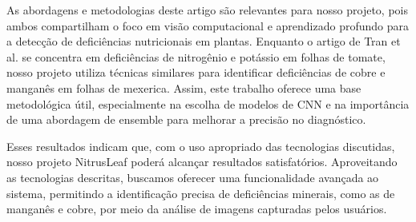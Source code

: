 As abordagens e metodologias deste artigo são relevantes para nosso projeto, pois ambos compartilham o foco em visão computacional e aprendizado profundo para a detecção de deficiências nutricionais em plantas. Enquanto o artigo de Tran et al. se concentra em deficiências de nitrogênio e potássio em folhas de tomate, nosso projeto utiliza técnicas similares para identificar deficiências de cobre e manganês em folhas de mexerica. Assim, este trabalho oferece uma base metodológica útil, especialmente na escolha de modelos de CNN e na importância de uma abordagem de ensemble para melhorar a precisão no diagnóstico.

Esses resultados indicam que, com o uso apropriado das tecnologias discutidas, nosso projeto NitrusLeaf poderá alcançar resultados satisfatórios. Aproveitando as tecnologias descritas, buscamos oferecer uma funcionalidade avançada ao sistema, permitindo a identificação precisa de deficiências minerais, como as de manganês e cobre, por meio da análise de imagens capturadas pelos usuários.